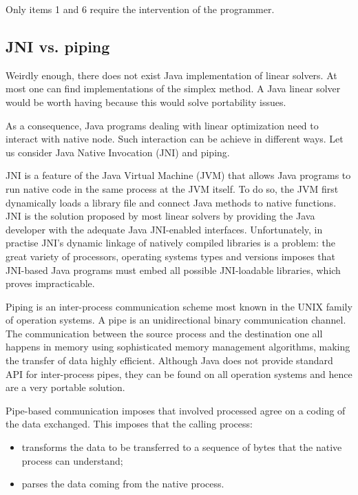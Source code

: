 \documentclass{article}
\begin{document}
Only items 1 and 6 require the intervention of the programmer.


\subsection{JNI vs. piping}

Weirdly enough, there does not exist Java implementation of linear solvers. At most one can find implementations
of the simplex method. A Java linear solver would be worth having because this would solve portability issues.

As a consequence, Java programs dealing with linear optimization need to interact with native node. Such interaction
can be achieve in different ways. Let us consider Java Native Invocation (JNI) and piping.

JNI is a feature of the Java Virtual Machine (JVM) that allows  Java programs to run native code in the same process
at the JVM itself. To do so, the JVM first dynamically loads a library file and connect Java methods to native functions.
JNI is the solution proposed by most linear solvers by providing the Java developer with the adequate Java JNI-enabled interfaces. 
 Unfortunately, in practise 
JNI's  dynamic linkage of natively compiled libraries is a problem:  the great variety of processors, operating systems
types and versions imposes that JNI-based Java programs must embed all possible JNI-loadable libraries, which proves
impracticable.
 
 Piping is an inter-process communication scheme most known in the UNIX family of operation systems.
 A pipe is an unidirectional binary communication channel. The communication between the source process and the destination one
 all happens in memory using sophisticated memory management algorithms, making the  transfer of data highly efficient.
 Although Java does not provide standard API for inter-process pipes, they can be found on all operation systems and hence are
 a very portable solution. 

 Pipe-based communication imposes that involved processed agree on a coding of the data exchanged. This imposes that
 the calling process:
 \begin{itemize}
  \item transforms the data to be transferred to a sequence of bytes that the native process can understand;
  \item parses the data coming from the native process. 
\end{itemize}
 
\end{document}
